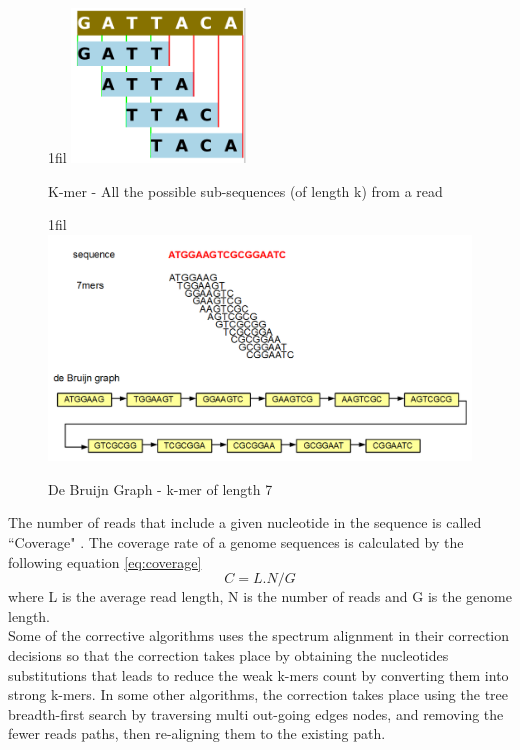 \documentclass[12pt,openany]{llncs}
\makeatletter
\newcommand*{\centerfloat}{%
  \parindent \z@
  \leftskip \z@ \@plus 1fil \@minus \textwidth
  \rightskip\leftskip
  \parfillskip \z@skip}
\makeatother
\begin{document}
\vspace{1cm}
\begin{figure}
	\centerfloat
	\includegraphics[width=.3\linewidth]{./figs/CrrConcepts-1}
	\caption{\label{fig:fig-CrrConcepts-1}{K-mer} - All the possible sub-sequences (of length k) from a read}
\end{figure}
\vspace{1cm}
\begin{figure}
	\centerfloat
	\includegraphics[width=1\linewidth]{./figs/CrrConcepts-2}
	\caption{\label{fig:fig-CrrConcepts-2}{De Bruijn Graph} - k-mer of length 7}
\end{figure} 
\newpage
\noindent The number of reads that include a given nucleotide in the sequence is called ``Coverage" \cite{coverage}. The coverage rate of a genome sequences is calculated by the following equation \ref{eq:coverage}
\begin{equation} \label{eq:coverage}
 C = L.N/G 
\end{equation}
where L is the average read length, N is the number of reads and G is the genome length.
\\
Some of the corrective algorithms uses the spectrum alignment in their correction decisions so that the correction takes place by obtaining the nucleotides substitutions that leads to reduce the weak k-mers count by converting them into strong k-mers.
In some other algorithms, the correction takes place using the tree breadth-first search by traversing multi out-going edges nodes, and removing the fewer reads paths, then re-aligning them to the existing path.
\end{document}
